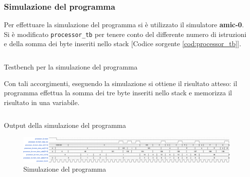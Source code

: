 \subsubsection*{Simulazione del programma}

Per effettuare la simulazione del programma si è utilizzato il simulatore \textbf{amic-0}. Si è modificato \texttt{processor\_tb} per tenere conto del differente numero di istruzioni e della somma dei byte inseriti nello stack [Codice sorgente \ref{cod:processor_tb}].

\begin{code}
    \inputminted{vhdl}{mal-ajvm/processor_tb.vhdl}
    \caption{Testbench per la simulazione del programma}
    \label{cod:processor_tb}
\end{code}

Con tali accorgimenti, eseguendo la simulazione si ottiene il risultato atteso: il programma effettua la somma dei tre byte inseriti nello stack e memorizza il risultato in una variabile.

\begin{code}
    \inputminted{text}{mal-ajvm/iadd_test.log}
    \caption{Output della simulazione del programma}
    \label{cod:iadd_test}
\end{code}

\begin{figure} [h]
    \centering
    \includegraphics[width=\linewidth]{img/processor_tb.pdf}
    \caption{Simulazione del programma}
    \label{fig:processor_tb}
\end{figure}
